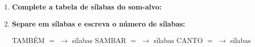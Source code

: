 \begin{exercicio}
\begin{enumerate}[resume]
  \item \textbf{Complete a tabela de sílabas do som-alvo:}

\begin{center}
\end{center}

  \item \textbf{Separe em sílabas e escreva o número de sílabas:}
  \begin{center}
  TAMBÉM $=$ \underline{\hspace{1.2cm}} $\rightarrow$ \underline{\hspace{0.8cm}} sílabas \quad SAMBAR $=$ \underline{\hspace{1.2cm}} $\rightarrow$ \underline{\hspace{0.8cm}} sílabas \quad CANTO $=$ \underline{\hspace{1.2cm}} $\rightarrow$ \underline{\hspace{0.8cm}} sílabas
  \end{center}

\end{enumerate}

\end{exercicio}



